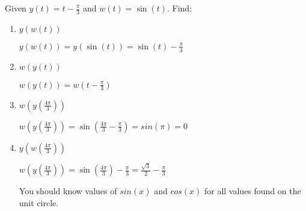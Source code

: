 \documentclass[nooutcomes, noinstructornotes]{ximera}
\begin{document}
\begin{instructorNotes}

\end{instructorNotes}



\begin{problem}
Given $y(t)=t- \frac{\pi}{3}$ and $w(t)=\sin(t)$.  Find:
\begin{enumerate}	
	\item  $y(w(t))$
		\begin{freeResponse}
			$y(w(t))=y\left( \sin(t) \right)=\sin(t)-\frac{\pi}{3}$
		\end{freeResponse}	


	\item  $w(y(t))$
		\begin{freeResponse}
		$w(y(t))=w\left( t-\frac{\pi}{3}\right)$
		\end{freeResponse}	


	\item  $w \left(y \left(\frac{4\pi}{3} \right)\right)$
		\begin{freeResponse}
		$w \left(y \left(\frac{4\pi}{3} \right)\right)=\sin \left(\frac{4\pi}{3}-\frac{\pi}{3}\right)=sin(\pi)=0$
		\end{freeResponse}	


	\item  $y(w(\frac{4\pi}{3}))$
		\begin{freeResponse}
		$w \left(y \left(\frac{4\pi}{3} \right)\right)=\sin \left(\frac{4\pi}{3}\right)-\frac{\pi}{3}=\frac{\sqrt{3}}{2}-\frac{\pi}{3}$

		You should know values of $sin(x)$ and $cos(x)$ for all values found on the unit circle.
		\end{freeResponse}	
	
	\end{enumerate}
	
	
\end{problem}

\begin{instructorNotes}

\end{instructorNotes}
\end{document}
